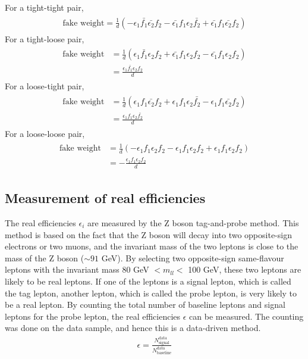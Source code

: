 For a tight-tight pair,
\begin{align}
\begin{split}
\text{fake weight} = \frac{1}{d} (
- \epsilon_1 \bar{f_1} \bar{\epsilon_2} f_2
- \bar{\epsilon_1} f_1 \epsilon_2 \bar{f_2}
+ \bar{\epsilon_1} f_1 \bar{\epsilon_2} f_2 )
\end{split}
\end{align}
For a tight-loose pair,
\begin{align}
\begin{split}
\text{fake weight} &= \frac{1}{d} (
\epsilon_1 \bar{f_1} \epsilon_2 f_2
+ \bar{\epsilon_1} f_1 \epsilon_2 f_2
- \bar{\epsilon_1} f_1 \epsilon_2 f_2 ) \\
&= \frac{\epsilon_1 \bar{f_1} \epsilon_2 f_2}{d}
\end{split}
\end{align}
For a loose-tight pair,
\begin{align}
\begin{split}
\text{fake weight} &= \frac{1}{d} (
\epsilon_1 f_1 \bar{\epsilon_2} f_2
+ \epsilon_1 f_1 \epsilon_2 \bar{f_2}
- \epsilon_1 f_1 \bar{\epsilon_2} f_2 ) \\
&= \frac{\epsilon_1 f_1 \epsilon_2 \bar{f_2}}{d}
\end{split}
\end{align}
For a loose-loose pair,
\begin{align}
\begin{split}
\text{fake weight} &= \frac{1}{d} (
- \epsilon_1 f_1 \epsilon_2 f_2
- \epsilon_1 f_1 \epsilon_2 f_2
+ \epsilon_1 f_1 \epsilon_2 f_2 ) \\
&= - \frac{\epsilon_1 f_1 \epsilon_2 f_2}{d}
\end{split}
\end{align}

\subsection{Measurement of real efficiencies}
The real efficiencies $\epsilon_i$ are measured by the Z boson tag-and-probe method.
This method is based on the fact that the Z boson will decay into two opposite-sign electrons or two muons, and the invariant mass of the two leptons is close to the mass of the Z boson ($\sim 91$ GeV).
By selecting two opposite-sign same-flavour leptons with the invariant mass 80 GeV $< m_{ll} <$ 100 GeV, these two leptons are likely to be real leptons.
If one of the leptons is a signal lepton, which is called the tag lepton, another lepton, which is called the probe lepton, is very likely to be a real lepton.
By counting the total number of baseline leptons and signal leptons for the probe lepton, the real efficiencies $\epsilon$ can be measured.
The counting was done on the data sample, and hence this is a data-driven method.
\begin{align}
\epsilon = \frac{N^{\text{data}}_{\text{signal}}}{N^{\text{data}}_{\text{baseline}}}
\end{align}

